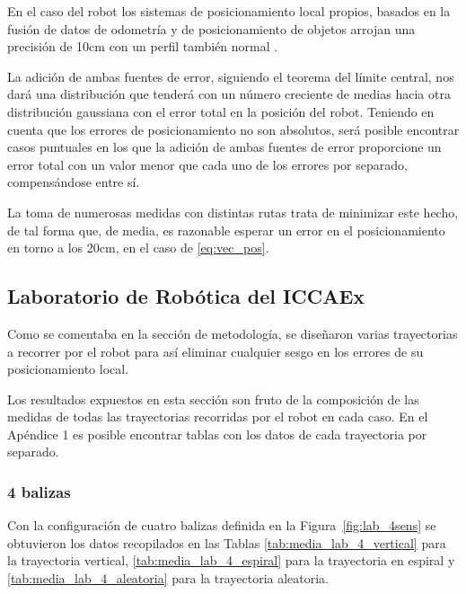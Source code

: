 En el caso del robot los sistemas de posicionamiento local propios, basados en la fusión de datos de odometría y de posicionamiento de objetos arrojan una precisión de 10cm con un perfil también normal \cite{POSRobot}.

La adición de ambas fuentes de error, siguiendo el teorema del límite central, nos dará una distribución que tenderá con un número creciente de medias hacia otra distribución gaussiana con el error total en la posición del robot.
Teniendo en cuenta que los errores de posicionamiento no son absolutos, será posible encontrar casos puntuales en los que la adición de ambas fuentes de error proporcione un error total con un valor menor que cada uno de los errores por separado, compensándose entre sí.

La toma de numerosas medidas con distintas rutas trata de minimizar este hecho, de tal forma que, de media, es razonable esperar un error en el posicionamiento en torno a los 20cm, en el caso de \eqref{eq:vec_pos}.

\subsection{Laboratorio de Robótica del ICCAEx}

Como se comentaba en la sección de metodología, se diseñaron varias trayectorias a recorrer por el robot para así eliminar cualquier sesgo en los errores de su posicionamiento local.

Los resultados expuestos en esta sección son fruto de la composición de las medidas de todas las trayectorias recorridas por el robot en cada caso.
En el Apéndice 1 es posible encontrar tablas con los datos de cada trayectoria por separado.

\subsubsection{4 balizas}

Con la configuración de cuatro balizas definida en la Figura~\ref{fig:lab_4sens} se obtuvieron los datos recopilados en las Tablas \ref{tab:media_lab_4_vertical} para la trayectoria vertical, \ref{tab:media_lab_4_espiral} para la trayectoria en espiral y \ref{tab:media_lab_4_aleatoria} para la trayectoria aleatoria.

